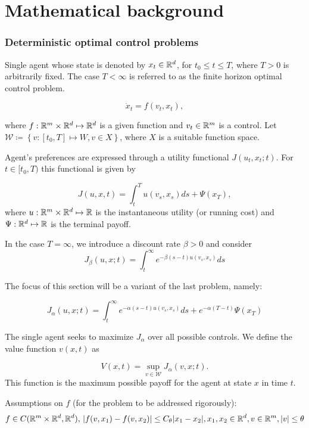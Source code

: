 \documentclass{article}
\begin{document}


\section{Mathematical background}\label{appendix-mathematical-background}

\subsubsection{Deterministic optimal control problems}\label{deterministic_optimal_control}

Single agent whose state is denoted by $x_t \in \mathbb{R}^d$, for $t_0 \leq t\leq T$, where $T > 0$ is arbitrarily fixed. The case $T< \infty$ is referred to as the finite horizon optimal control problem.

$$\dot x_t = f(v_t,x_t),$$

where $f: \mathbb{R}^m \times \mathbb{R}^d \mapsto \mathbb{R}^d$ is a given function and $v_t \in \mathbb{R}^m$ is a control. Let $\mathcal{W} \coloneqq \left\{ v : [t_0, T] \mapsto W, v \in X \right\}$, where $X$ is a suitable function space.

Agent's preferences are expressed through a utility functional $J(u_t, x_t; t)$. For $t \in [t_0,T)$ this functional is given by 

$$
J(u,x,t) = \int_t^T u(v_s, x_s) ds + \Psi(x_T),
$$
where $u : \mathbb{R}^m\times \mathbb{R}^d \mapsto \mathbb{R}$ is the instantaneous utility (or running cost) and $\Psi : \mathbb{R}^d \mapsto \mathbb{R}$ is the terminal payoff.

In the case $T = \infty$, we introduce a discount rate $\beta > 0$ and consider
$$
J_\beta (u,x;t) = \int_t^\infty e^{-\beta (s - t) u(v_s, x_s)} ds 
$$

The focus of this section will be a variant of the last problem, namely:

$$
J_\alpha (u,x;t) = \int_t^\infty e^{-\alpha (s - t) u(v_s, x_s)} ds + e^{-\alpha (T -t)} \Psi(x_T) 
$$

The single agent seeks to maximize $J_\alpha$ over all possible controls.
We define the value function $v(x,t)$ as

$$
V(x,t) = \sup_{v\in \mathcal{W}} J_\alpha (v, x ; t).
$$
This function is the maximum possible payoff for the agent at state $x$ in time $t$.

Assumptions on $f$ (for the problem to be addressed rigorously):
$$f \in C(\mathbb{R}^m \times \mathbb{R}^d, \mathbb{R}^d),\, |f(v, x_1) - f(v, x_2)| \leq C_\theta |x_1 - x_2|, x_1, x_2 \in \mathbb{R}^d, v\in \mathbb{R}^m, |v| \leq \theta$$
\end{document}
